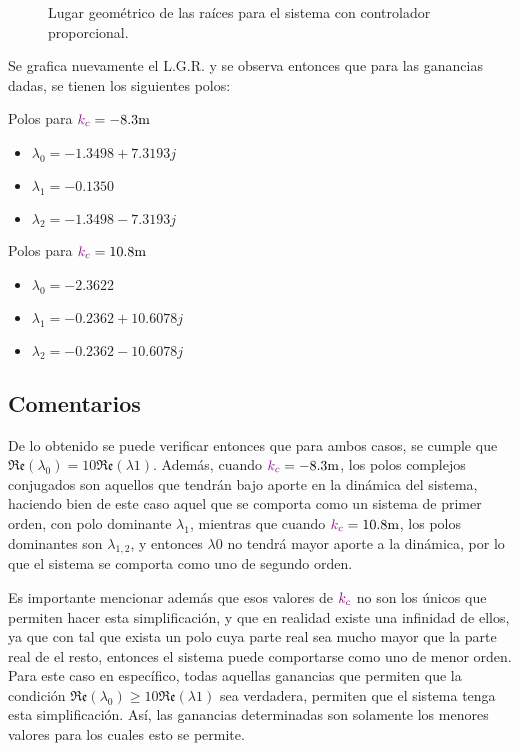 \begin{figure}[ht]
  \centering
  
  \caption{Lugar geométrico de las raíces para el sistema con controlador proporcional.}
  \label{fig:lgr-e}
\end{figure}

Se grafica nuevamente el L.G.R. y se observa entonces que para las ganancias dadas,
se tienen los siguientes polos:
\begin{multicols}{2}
    Polos para $\mora{k_{c}} = -8.3\unit{m}$
    \begin{itemize}
        \item $\lambda_{0} = -1.3498 + 7.3193j$
        \item $\lambda_{1} = -0.1350$
        \item $\lambda_{2} = -1.3498 - 7.3193j$
    \end{itemize}

    Polos para $\mora{k_{c}} = 10.8\unit{m}$
    \begin{itemize}
        \item $\lambda_{0} = -2.3622$
        \item $\lambda_{1} = -0.2362 +10.6078j$
        \item $\lambda_{2} = -0.2362 -10.6078j$
    \end{itemize}
\end{multicols}

\FloatBarrier
\subsection{Comentarios}

De lo obtenido se puede verificar entonces que para ambos casos, se cumple que
$\mathfrak{Re}(\lambda_{0}) = 10\mathfrak{Re}(\lambda{1})$. Además, cuando
$\mora{k_{c}} = -8.3\unit{m}$, los polos complejos conjugados son aquellos que
tendrán bajo aporte en la dinámica del sistema, haciendo bien de este caso aquel
que se comporta como un sistema de primer orden, con polo dominante $\lambda_{1}$,
mientras que cuando $\mora{k_{c}} = 10.8\unit{m}$, los polos dominantes son
$\lambda_{1,2}$, y entonces $\lambda{0}$ no tendrá mayor aporte a la dinámica, por
lo que el sistema se comporta como uno de segundo orden.

Es importante mencionar además que esos valores de $\mathbin{\color{violet}k_{c}}$ no son los
únicos que permiten hacer esta simplificación, y que en realidad existe una
infinidad de ellos, ya que con tal que exista un polo cuya parte real sea mucho
mayor que la parte real de el resto, entonces el sistema puede comportarse como
uno de menor orden. Para este caso en específico, todas aquellas ganancias que
permiten que la condición $\mathfrak{Re}(\lambda_{0}) \geq 10\mathfrak{Re}(\lambda{1})$
sea verdadera, permiten que el sistema tenga esta simplificación. Así, las
ganancias determinadas son solamente los menores valores para los cuales esto
se permite.
